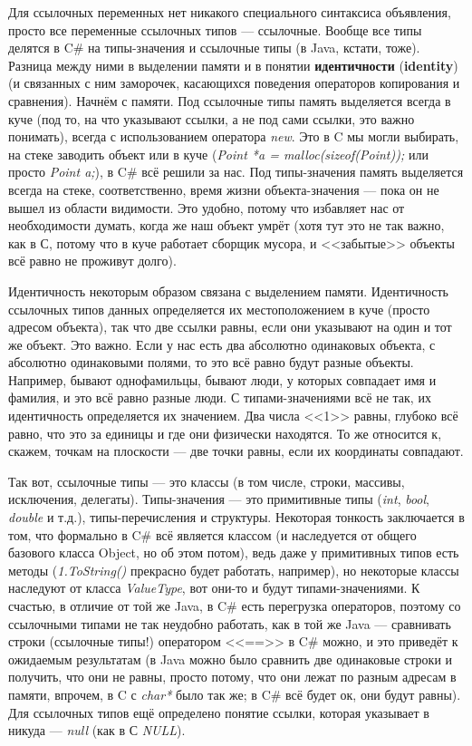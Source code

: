 \documentclass[a5paper]{article}
\begin{document}
Для ссылочных переменных нет никакого специального синтаксиса объявления, просто все переменные ссылочных типов --- ссылочные. Вообще все типы делятся в C\# на типы-значения и ссылочные типы (в Java, кстати, тоже). Разница между ними в выделении памяти и в понятии \textbf{идентичности} (\textbf{identity}) (и связанных с ним заморочек, касающихся поведения операторов копирования и сравнения). Начнём с памяти. Под ссылочные типы память выделяется всегда в куче (под то, на что указывают ссылки, а не под сами ссылки, это важно понимать), всегда с использованием оператора \textit{new}. Это в C мы могли выбирать, на стеке заводить объект или в куче (\textit{Point *a = malloc(sizeof(Point));} или просто \textit{Point a;}), в C\# всё решили за нас. Под типы-значения память выделяется всегда на стеке, соответственно, время жизни объекта-значения --- пока он не вышел из области видимости. Это удобно, потому что избавляет нас от необходимости думать, когда же наш объект умрёт (хотя тут это не так важно, как в С, потому что в куче работает сборщик мусора, и <<забытые>> объекты всё равно не проживут долго).

Идентичность некоторым образом связана с выделением памяти. Идентичность ссылочных типов данных определяется их местоположением в куче (просто адресом объекта), так что две ссылки равны, если они указывают на один и тот же объект. Это важно. Если у нас есть два абсолютно одинаковых объекта, с абсолютно одинаковыми полями, то это всё равно будут разные объекты. Например, бывают однофамильцы, бывают люди, у которых совпадает имя и фамилия, и это всё равно разные люди. С типами-значениями всё не так, их идентичность определяется их значением. Два числа <<1>> равны, глубоко всё равно, что это за единицы и где они физически находятся. То же относится к, скажем, точкам на плоскости --- две точки равны, если их координаты совпадают.

Так вот, ссылочные типы --- это классы (в том числе, строки, массивы, исключения, делегаты). Типы-значения --- это примитивные типы (\textit{int}, \textit{bool}, \textit{double} и т.д.), типы-перечисления и структуры. Некоторая тонкость заключается в том, что формально в C\# всё является классом (и наследуется от общего базового класса Object, но об этом потом), ведь даже у примитивных типов есть методы (\textit{1.ToString()} прекрасно будет работать, например), но некоторые классы наследуют от класса \textit{ValueType}, вот они-то и будут типами-значениями. К счастью, в отличие от той же Java, в C\# есть перегрузка операторов, поэтому со ссылочными типами не так неудобно работать, как в той же Java --- сравнивать строки (ссылочные типы!) оператором <<==>> в C\# можно, и это приведёт к ожидаемым результатам (в Java можно было сравнить две одинаковые строки и получить, что они не равны, просто потому, что они лежат по разным адресам в памяти, впрочем, в C с \textit{char*} было так же; в C\# всё будет ок, они будут равны). Для ссылочных типов ещё определено понятие ссылки, которая указывает в никуда --- \textit{null} (как в С \textit{NULL}).
\end{document}
